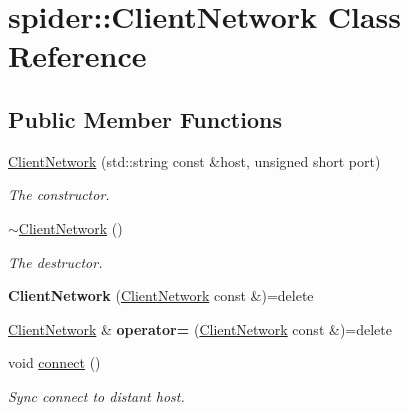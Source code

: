 \hypertarget{classspider_1_1_client_network}{}\section{spider\+:\+:Client\+Network Class Reference}
\label{classspider_1_1_client_network}
\subsection*{Public Member Functions}
\begin{DoxyCompactItemize}
\item 
\hyperlink{classspider_1_1_client_network_a03f8f213aa0855475d2884cdfd12cd34}{Client\+Network} (std\+::string const \&host, unsigned short port)
\begin{DoxyCompactList}\small\item\em The constructor. \end{DoxyCompactList}\item 
\mbox{\label{classspider_1_1_client_network_a1e24a6b70b45997fee897caeb3c0c49f}} 
\hyperlink{classspider_1_1_client_network_a1e24a6b70b45997fee897caeb3c0c49f}{$\sim$\+Client\+Network} ()
\begin{DoxyCompactList}\small\item\em The destructor. \end{DoxyCompactList}\item 
\mbox{\label{classspider_1_1_client_network_ac754d8a8cdd2d84e47b6b73fecc46700}} 
{\bfseries Client\+Network} (\hyperlink{classspider_1_1_client_network}{Client\+Network} const \&)=delete
\item 
\mbox{\label{classspider_1_1_client_network_ac0761e47764b838996e2b65c5282ce28}} 
\hyperlink{classspider_1_1_client_network}{Client\+Network} \& {\bfseries operator=} (\hyperlink{classspider_1_1_client_network}{Client\+Network} const \&)=delete
\item 
\mbox{\label{classspider_1_1_client_network_ab308d2c05e4e306344534b0f2d0d5016}} 
void \hyperlink{classspider_1_1_client_network_ab308d2c05e4e306344534b0f2d0d5016}{connect} ()
\begin{DoxyCompactList}\small\item\em Sync connect to distant host. \end{DoxyCompactList}\item 

\end{DoxyCompactItemize}
